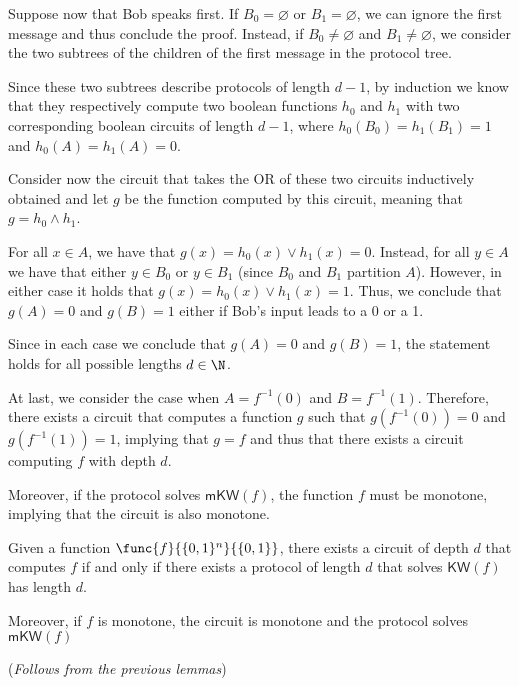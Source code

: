 \documentclass[a4paper, 12pt]{report}
\begin{document}
{        Suppose now that Bob speaks first. If $B_0 = \varnothing$ or $B_1 = \varnothing$, we can ignore the first message and thus conclude the proof. Instead, if $B_0 \neq \varnothing$ and $B_1 \neq \varnothing$, we consider the two subtrees of the children of the first message in the protocol tree.
        
        Since these two subtrees describe protocols of length $d-1$, by induction we know that they respectively compute two boolean functions $h_0$ and $h_1$ with two corresponding boolean circuits of length $d-1$, where $h_0(B_0) = h_1(B_1) = 1$ and $h_0(A) = h_1(A) = 0$.

        Consider now the circuit that takes the \textsf{OR} of these two circuits inductively obtained and let $g$ be the function computed by this circuit, meaning that $g = h_0 \land h_1$.
        
        For all $x \in A$, we have that $g(x) = h_0(x) \lor h_1(x) = 0$. Instead, for all $y \in A$ we have that either $y \in B_0$ or $y \in B_1$ (since $B_0$ and $B_1$ partition $A$). However, in either case it holds that $g(x) = h_0(x) \lor h_1(x) = 1$. Thus, we conclude that $g(A) = 0$ and $g(B) = 1$ either if Bob's input leads to a 0 or a 1.

        Since in each case we conclude that $g(A) = 0$ and $g(B) = 1$, the statement holds for all possible lengths $d \in \N$.
        
        At last, we consider the case when $A = f^{-1}(0)$ and $B = f^{-1}(1)$. Therefore, there exists a circuit that computes a function $g$ such that $g(f^{-1}(0)) = 0$ and $g(f^{-1}(1)) = 1$, implying that $g = f$ and thus that there exists a circuit computing $f$ with depth $d$.

        Moreover, if the protocol solves $\mathsf{mKW}(f)$, the function $f$ must be monotone, implying that the circuit is also monotone.
    }

    \begin{framedthm}{}
        Given a function $\func{f}{\{0,1\}^n}{\{0,1\}}$, there exists a circuit of depth $d$ that computes $f$ if and only if there exists a protocol of length $d$ that solves $\mathsf{KW}(f)$ has length $d$.

        Moreover, if $f$ is monotone, the circuit is monotone and the protocol solves $\mathsf{mKW}(f)$

        (\textit{Follows from the previous lemmas})
    \end{framedthm}
\end{document}
